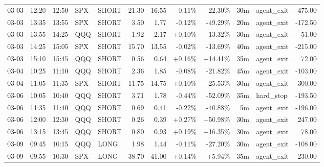 \documentclass[11pt,a4paper,twoside]{article}
\begin{document}
\begin{center}
\begin{longtable}{>{\color{txtmain}}l l l l l r r r r r >{\color{txtmain}}l r}
03-03 & 12:20 & 12:50 & SPX & SHORT & 21.30 & 16.55 & \textcolor{lossred}{-0.11\%} & \textcolor{lossred}{-22.30\%} & 30m & agent\_exit & \textcolor{lossred}{-475.00} \\
03-03 & 13:35 & 13:55 & SPX & SHORT & 3.50 & 1.77 & \textcolor{lossred}{-0.12\%} & \textcolor{lossred}{-49.29\%} & 20m & agent\_exit & \textcolor{lossred}{-172.50} \\
03-03 & 13:55 & 14:25 & QQQ & SHORT & 1.92 & 2.17 & \textcolor{wingreen}{+0.10\%} & \textcolor{wingreen}{+13.32\%} & 30m & agent\_exit & \textcolor{wingreen}{51.00} \\
03-03 & 14:25 & 15:05 & SPX & SHORT & 15.70 & 13.55 & \textcolor{lossred}{-0.02\%} & \textcolor{lossred}{-13.69\%} & 40m & agent\_exit & \textcolor{lossred}{-215.00} \\
03-03 & 15:10 & 15:45 & QQQ & SHORT & 0.56 & 0.64 & \textcolor{wingreen}{+0.16\%} & \textcolor{wingreen}{+14.41\%} & 35m & agent\_exit & \textcolor{wingreen}{72.00} \\
03-04 & 10:25 & 11:10 & QQQ & SHORT & 2.36 & 1.85 & \textcolor{lossred}{-0.08\%} & \textcolor{lossred}{-21.82\%} & 45m & agent\_exit & \textcolor{lossred}{-103.00} \\
03-04 & 11:05 & 11:35 & SPX & SHORT & 11.75 & 14.75 & \textcolor{wingreen}{+0.10\%} & \textcolor{wingreen}{+25.53\%} & 30m & agent\_exit & \textcolor{wingreen}{300.00} \\
03-06 & 10:05 & 10:40 & QQQ & SHORT & 3.71 & 1.78 & \textcolor{lossred}{-0.44\%} & \textcolor{lossred}{-52.09\%} & 35m & hard\_stop & \textcolor{lossred}{-193.50} \\
03-06 & 11:35 & 11:40 & QQQ & SHORT & 0.69 & 0.41 & \textcolor{lossred}{-0.22\%} & \textcolor{lossred}{-40.88\%} & 5m & agent\_exit & \textcolor{lossred}{-196.00} \\
03-06 & 12:00 & 12:30 & QQQ & SHORT & 0.26 & 0.39 & \textcolor{wingreen}{+0.27\%} & \textcolor{wingreen}{+50.98\%} & 30m & agent\_exit & \textcolor{wingreen}{247.00} \\
03-06 & 13:15 & 13:45 & QQQ & SHORT & 0.80 & 0.93 & \textcolor{wingreen}{+0.19\%} & \textcolor{wingreen}{+16.35\%} & 30m & agent\_exit & \textcolor{wingreen}{78.00} \\
03-09 & 09:45 & 10:15 & QQQ & LONG & 1.98 & 1.44 & \textcolor{lossred}{-0.11\%} & \textcolor{lossred}{-27.20\%} & 30m & agent\_exit & \textcolor{lossred}{-108.00} \\
03-09 & 09:55 & 10:30 & SPX & LONG & 38.70 & 41.00 & \textcolor{wingreen}{+0.14\%} & \textcolor{wingreen}{+5.94\%} & 35m & agent\_exit & \textcolor{wingreen}{230.00} \\

\end{longtable}
\end{center}
\end{document}
